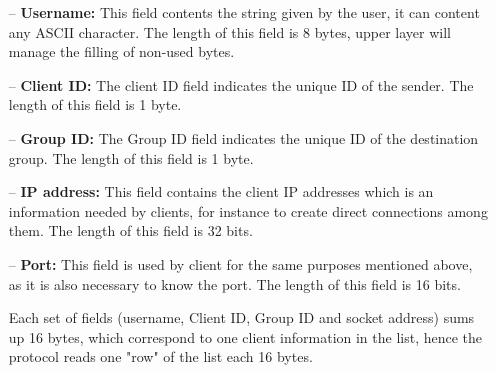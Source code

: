 \documentclass{article}
\begin{document}
\begin{description}[align=left]
    \begin{itemize}
        \item[--]\textbf{Username:} This field contents the string given by the user, it can content any ASCII character. The length of this field is 8 bytes, upper layer will manage the filling of non-used bytes.
        \item[--]\textbf{Client ID:} The client ID field indicates the unique ID of the sender. The length of this field is 1 byte.
        \item[--]\textbf{Group ID:} The Group ID field indicates the unique ID of the destination group. The length of this field is 1 byte.
        \item[--]\textbf{IP address:} This field contains the client IP addresses which is an information needed by clients, for instance to create direct connections among them. The length of this field is 32 bits.
        \item[--]\textbf{Port:} This field is used by client for the same purposes mentioned above, as it is also necessary to know the port. The length of this field is 16 bits.
        \begin{flushleft}
            Each set of fields (username, Client ID, Group ID and socket address) sums up 16 bytes, which correspond to one client information in the list, hence the protocol reads one "row" of the list each 16 bytes.
        \end{flushleft}
    \end{itemize}
\end{description}
\end{document}
